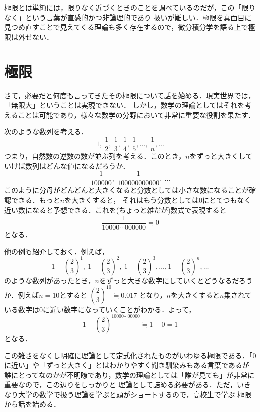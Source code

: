 \documentclass[a4paper,12pt,autodetect-engine,dvipdfmx]{jsarticle}
\theoremstyle{definition}
\begin{document}
極限とは単純には，限りなく近づくときのことを調べているのだが，この「限りなく」という言葉が直感的かつ非論理的であり
扱いが難しい．極限を真面目に見つめ直すことで見えてくる理論も多く存在するので，微分積分学を語る上で極限は外せない．
\section{極限}
さて，必要だと何度も言ってきたその極限について話を始める．現実世界では，「無限大」ということは実現できない．
しかし，数学の理論としてはそれを考えることは可能であり，様々な数学の分野において非常に重要な役割を果たす．

次のような数列を考える．
\begin{equation*}
    1,\ \dfrac{1}{2},\ \dfrac{1}{3},\ \dfrac{1}{4},\ \dfrac{1}{5},\ldots,\ \dfrac{1}{n},\ldots
\end{equation*}
つまり，自然数の逆数の数が並ぶ列を考える．このとき，$n$をずっと大きくしていけば数列はどんな値になるだろうか．
\begin{equation*}
    \dfrac{1}{100000},\ \dfrac{1}{100000000000},\ \ldots
\end{equation*}
このように分母がどんどんと大きくなると分数としては小さな数になることが確認できる．もっと$n$を大きくすると，
それはもう分数としては0にとてつもなく近い数になると予想できる．これを(ちょっと雑だが)数式で表現すると
\begin{equation*}
    \dfrac{1}{10000\cdots 000000} \fallingdotseq 0
\end{equation*}
となる．

他の例も紹介しておく．例えば，
\begin{equation*}
    1-\left(\dfrac{2}{3}\right)^{1},\ 1-\left(\dfrac{2}{3}\right)^{2},\ 1-\left(\dfrac{2}{3}\right)^{3},\ldots , 1-\left(\dfrac{2}{3}\right)^{n},\ldots
\end{equation*}
のような数列があったとき，$n$をずっと大きな数字にしていくとどうなるだろうか．例えば$n=10$とすると
$\left(\dfrac{2}{3}\right)^{10} \fallingdotseq 0.017$
となり，$n$を大きくすると$n$乗されている数字は0に近い数字になっていくことがわかる．よって，
\begin{equation*}
    1 - \left(\dfrac{2}{3}\right)^{10000\cdots 00000} \fallingdotseq 1 - 0 = 1
\end{equation*}
となる．

この雑さをなくし明確に理論として定式化されたものがいわゆる極限である．「0に近い」や「ずっと大きく」とはわかりやすく聞き馴染みもある言葉であるが
誰にとってなのかが不明瞭であり，数学の理論としては「誰が見ても」が非常に重要なので，この辺りをしっかりと
理論として詰める必要がある．ただ，いきなり大学の数学で扱う理論を学ぶと頭がショートするので，高校生で学ぶ
極限から話を始める．
\end{document}
